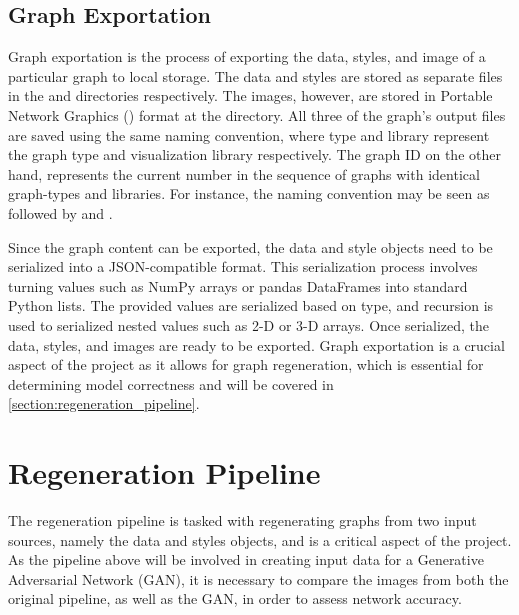 \subsection{Graph Exportation}
\label{subsection:graph_exportation}
Graph exportation is the process of exporting the data, styles, and image of a particular graph to local storage. The data and styles are stored as separate  files in the  and  directories respectively. The images, however, are stored in Portable Network Graphics () format at the  directory. All three of the graph's output files are saved using the same  naming convention, where type and library represent the graph type and visualization library respectively. The graph ID on the other hand, represents the current number in the sequence of graphs with identical graph-types and libraries. For instance, the naming convention may be seen as  followed by  and . 

\hfill

Since the graph content can be exported, the data and style objects need to be serialized into a JSON-compatible format. This serialization process involves turning values such as NumPy arrays or pandas DataFrames into standard Python lists. The provided values are serialized based on type, and recursion is used to serialized nested values such as 2-D or 3-D arrays. Once serialized, the data, styles, and images are ready to be exported. Graph exportation is a crucial aspect of the project as it allows for graph regeneration, which is essential for determining model correctness and will be covered in \autoref{section:regeneration_pipeline}.

\section{Regeneration Pipeline}
\label{section:regeneration_pipeline}
The regeneration pipeline is tasked with regenerating graphs from two input sources, namely the data and styles objects, and is a critical aspect of the project. As the pipeline above will be involved in creating input data for a Generative Adversarial Network (GAN), it is necessary to compare the images from both the original pipeline, as well as the GAN, in order to assess network accuracy.

